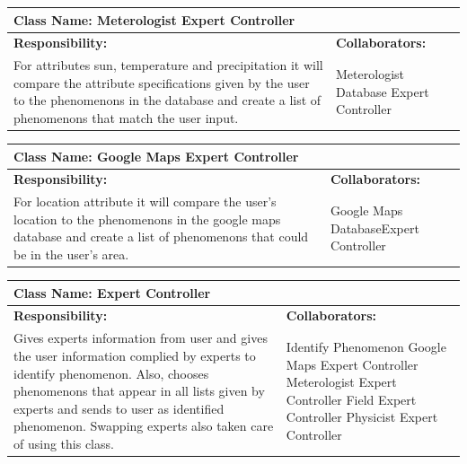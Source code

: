 \documentclass[]{article}
\begin{document}
\pagebreak 
	\begin{table}[!hb]
		\centering
		\begin{tabular}{|p{5cm}|p{5cm}|}
		\hline 
		 \multicolumn{2}{|l|}{\textbf{Class Name: Meterologist Expert Controller}} \\
		\hline
		\textbf{Responsibility:} & \textbf{Collaborators:} \\
		\hline
		For attributes sun, temperature and precipitation it will compare the attribute specifications given by the user to the phenomenons in the database and create a list of phenomenons that match the user input.& Meterologist Database \newline Expert Controller\\
		\hline
		\end{tabular}
	\end{table}



	\begin{table}[!hb]
		\centering
		\begin{tabular}{|p{5cm}|p{5cm}|}
		\hline 
		 \multicolumn{2}{|l|}{\textbf{Class Name: Google Maps Expert Controller}} \\
		\hline
		\textbf{Responsibility:} & \textbf{Collaborators:} \\
		\hline
		For location attribute it will compare the user's location to the phenomenons in the google maps database and create a list of phenomenons that could be in the user's area.& Google Maps Database\newline Expert Controller\\
		\hline
		\end{tabular}
	\end{table}


	\begin{table}[!hb]
		\centering
		\begin{tabular}{|p{5cm}|p{5cm}|}
		\hline 
		 \multicolumn{2}{|l|}{\textbf{Class Name: Expert Controller}} \\
		\hline
		\textbf{Responsibility:} & \textbf{Collaborators:} \\
		\hline
		Gives experts information from user and gives the user information complied by experts to identify phenomenon. Also, chooses phenomenons that appear in all lists given by experts and sends to user as identified phenomenon. Swapping experts also taken care of using this class.  & Identify Phenomenon \newline Google Maps Expert Controller \newline Meterologist Expert Controller \newline Field Expert Controller \newline Physicist Expert Controller\\
		\hline
		\end{tabular}
	\end{table}
	
\end{document}
